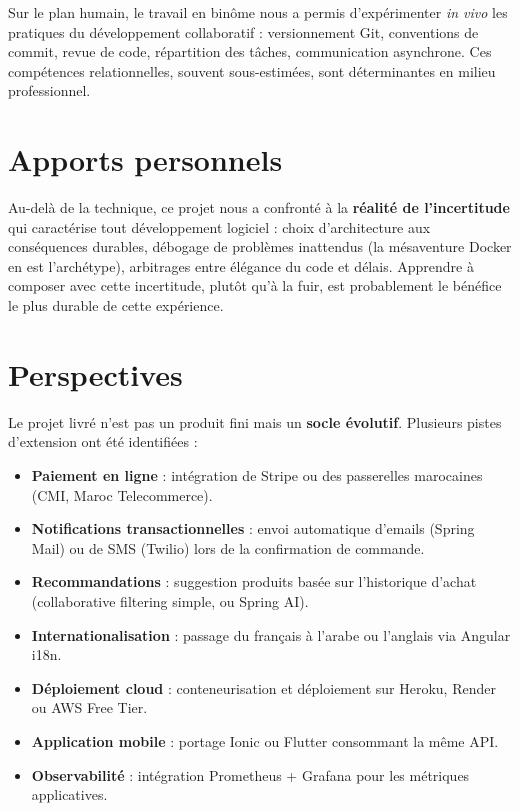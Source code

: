 \documentclass[11pt,a4paper,oneside]{report}
\begin{document}
Sur le plan humain, le travail en binôme nous a permis d'expérimenter
\textit{in vivo} les pratiques du développement collaboratif :
versionnement Git, conventions de commit, revue de code, répartition des
tâches, communication asynchrone. Ces compétences relationnelles, souvent
sous-estimées, sont déterminantes en milieu professionnel.

\section*{Apports personnels}

Au-delà de la technique, ce projet nous a confronté à la \textbf{réalité
de l'incertitude} qui caractérise tout développement logiciel : choix
d'architecture aux conséquences durables, débogage de problèmes inattendus
(la mésaventure Docker en est l'archétype), arbitrages entre élégance du
code et délais. Apprendre à composer avec cette incertitude, plutôt qu'à
la fuir, est probablement le bénéfice le plus durable de cette expérience.

\section*{Perspectives}

Le projet livré n'est pas un produit fini mais un \textbf{socle évolutif}.
Plusieurs pistes d'extension ont été identifiées :

\begin{itemize}
  \item \textbf{Paiement en ligne} : intégration de Stripe ou des
    passerelles marocaines (CMI, Maroc Telecommerce).
  \item \textbf{Notifications transactionnelles} : envoi automatique
    d'emails (Spring Mail) ou de SMS (Twilio) lors de la confirmation de
    commande.
  \item \textbf{Recommandations} : suggestion produits basée sur
    l'historique d'achat (collaborative filtering simple, ou Spring AI).
  \item \textbf{Internationalisation} : passage du français à l'arabe ou
    l'anglais via Angular i18n.
  \item \textbf{Déploiement cloud} : conteneurisation et déploiement sur
    Heroku, Render ou AWS Free Tier.
  \item \textbf{Application mobile} : portage Ionic ou Flutter consommant
    la même API.
  \item \textbf{Observabilité} : intégration Prometheus + Grafana pour les
    métriques applicatives.
\end{itemize}
\end{document}

